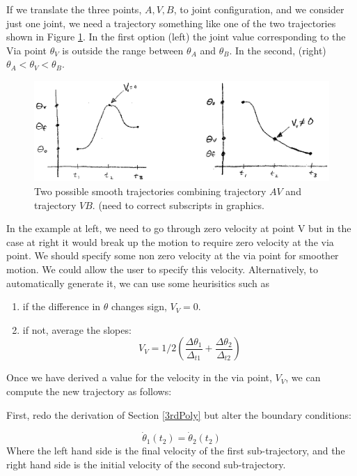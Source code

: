 If we translate the three points, $A, V, B$,  to joint configuration, and we consider just one joint, we need a trajectory something like one of the two trajectories shown in Figure \ref{viatrajectoryoptions}.  In the first option (left) the joint value corresponding to the Via point $\theta_V$ is outside the range between $\theta_A$ and $\theta_B$.  In the second, (right) $\theta_A < \theta_V < \theta_B$.

\begin{figure}\centering
\includegraphics[width=14.5cm]{figs07/00514.eps}\caption{Two possible smooth trajectories combining trajectory $AV$ and trajectory $VB$. (need to correct subscripts in graphics.}\label{viatrajectoryoptions}
\end{figure}




In the example at left, we need to go through zero velocity at point V but in the case at right it would break up the motion to require zero velocity at the via point.   We should specify some non zero velocity at the via point for smoother motion.   We could allow the user to specify this velocity.  Alternatively, to automatically generate it, we can use some heurisitics such as
\begin{enumerate}
  \item if the difference in $\theta$ changes sign, $V_V = 0$.
  \item if not, average the slopes:
\[
  V_V = 1/2 \left ( \frac{\Delta\theta_1}{\Delta_{t1}} + \frac{\Delta\theta_2}{\Delta_{t2}} \right )
\]
\end{enumerate}

Once we have derived a value for the velocity in the via point, $V_V$, we can compute the new trajectory as follows:

First, redo the derivation of Section \ref{3rdPoly} but alter the boundary conditions:

\[
\dot{\theta}_1{(t_2)} = \dot{\theta}_2(t_2)
\]
Where the left hand side is the final velocity of the first sub-trajectory, and the right hand side is the initial velocity of the second sub-trajectory.

